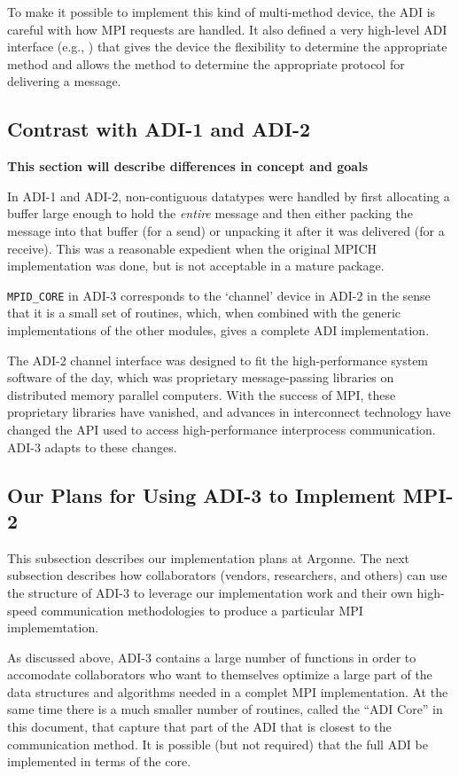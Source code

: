\documentclass{article}
\begin{document}
To make it possible to implement this kind of multi-method device, the
ADI is careful with how MPI requests are handled.  It also defined a
very high-level ADI interface (e.g., ) that gives the
device the flexibility to determine the appropriate method and allows
the method to determine the appropriate protocol for delivering a message.

\subsection{Contrast with ADI-1 and ADI-2}
\label{sec-historical}
\textbf{This section will describe differences in concept and goals}

In ADI-1 and ADI-2, non-contiguous datatypes were handled by first
allocating a buffer large enough to hold the \emph{entire} message and
then either packing the message into that buffer (for a send) or
unpacking it after it was delivered (for a receive).  This was a
reasonable expedient when the original MPICH implementation was done,
but is not acceptable in a mature package.

\texttt{MPID_CORE} in ADI-3 corresponds to the `channel' device in ADI-2 in
the sense that it is a small set of routines, which, when combined with the
generic implementations of the other modules, gives a complete ADI
implementation.  

The ADI-2 channel interface was designed to fit the high-performance system
software of the day, which was proprietary message-passing libraries on
distributed memory parallel computers.  With the success of MPI, these
proprietary libraries have vanished, and advances in interconnect technology
have changed the API used to access high-performance interprocess
communication.  ADI-3 adapts to these changes.


\subsection{Our Plans for Using ADI-3 to Implement MPI-2}
\label{sec:plans}

This subsection describes our implementation plans at Argonne.  The next
subsection describes how collaborators (vendors, researchers, and others) can
use the structure of ADI-3 to leverage our implementation work and their own
high-speed communication methodologies to produce a particular MPI
implememtation.

As discussed above, ADI-3 contains a large number of functions in order to
accomodate collaborators who want to themselves optimize a large part of the
data structures and algorithms needed in a complet MPI implementation.  At the
same time there is a much smaller number of routines, called the ``ADI Core''
in this document, that capture that part of the ADI that is closest to the
communication method. It is possible (but not required) that the full ADI be
implemented in terms of the core.
\end{document}
